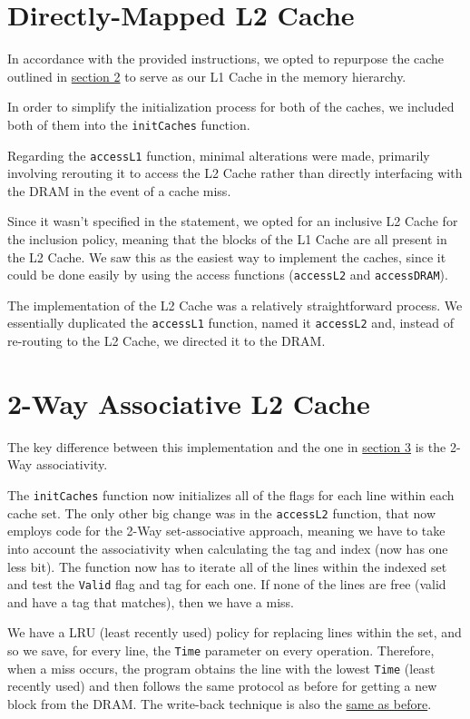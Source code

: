 \documentclass[12pt]{article}
\begin{document}
    \section{Directly-Mapped L2 Cache} \label{S3}

    In accordance with the provided instructions, we opted to repurpose the cache outlined in \hyperref[S2]{section 2} to serve as our L1 Cache in the memory hierarchy.

    In order to simplify the initialization process for both of the caches, we included both of them into the \texttt{initCaches}
    function.

    Regarding the \texttt{accessL1} function, minimal alterations were made, primarily involving rerouting it to access the L2 Cache rather than directly
    interfacing with the DRAM in the event of a cache miss.

    Since it wasn't specified in the statement, we opted for an inclusive L2 Cache for the inclusion policy, meaning that the blocks of the L1 Cache are all present
    in the L2 Cache. We saw this as the easiest way to implement the caches, since it could be done easily by using the access functions (\texttt{accessL2} and
    \texttt{accessDRAM}).

    The implementation of the L2 Cache was a relatively straightforward process. We essentially duplicated the \texttt{accessL1} function, named it \texttt{accessL2} and,
    instead of re-routing to the L2 Cache, we directed it to the DRAM.

    \section{2-Way Associative L2 Cache}

    The key difference between this implementation and the one in \hyperref[S3]{section 3} is the 2-Way associativity.

    The \texttt{initCaches} function now initializes all of the flags for each line within each cache set. The only other big change was in the \texttt{accessL2} function,
    that now employs code for the 2-Way set-associative approach, meaning we have to take into account the associativity when calculating the tag and index (now has one less bit).
    The function now has to iterate all of the lines within the indexed set and test the \texttt{Valid} flag and tag for each one. If none of the lines are free
    (valid and have a tag that matches), then we have a miss.

    We have a LRU (least recently used) policy for replacing lines within the set, and so we save, for every line, the \texttt{Time} parameter on every operation.
    Therefore, when a miss occurs, the program obtains the line with the lowest \texttt{Time} (least recently used) and then follows the same protocol as before for getting a new
    block from the DRAM. The write-back technique is also the \hyperref[WBT]{same as before}.
\end{document}
